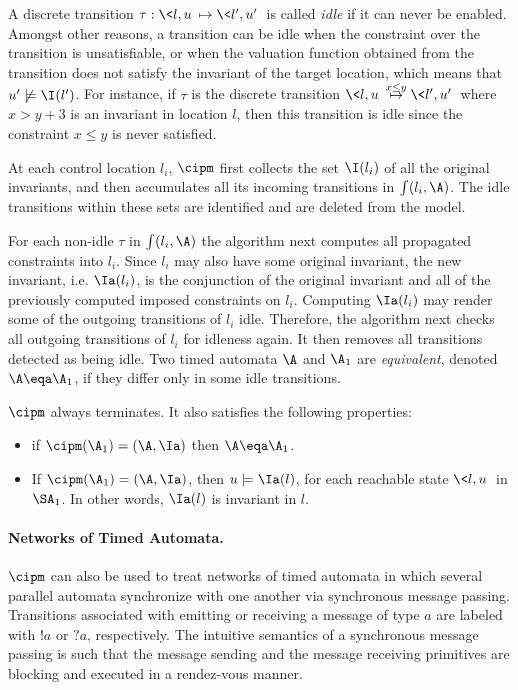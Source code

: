 \documentclass{eptcs}
\begin{document}
A discrete transition $\tau: \< l,u\>\mapsto\< l',u'\> $ is called {\em idle}
if it can never be enabled.  Amongst other reasons, a transition can be idle
when the constraint over the transition is unsatisfiable, or when the
valuation function obtained from the transition does not satisfy the invariant
of the target location, which means that $u'\not \models \I(l')$.  For
instance, if $\tau$ is the discrete transition $\<l,u\>\stackrel{x\leq
  y}{\mapsto}\<l',u'\>$ where $x> y+3$ is an invariant in location $l$, then
this transition is idle since the constraint $x\leq y$ is never satisfied.

At each control location $l_i$, $\cipm$ first collects the set $\I(l_i)$ of
all the original invariants, and then accumulates all its incoming transitions
in $\int(l_i,\A)$.  The idle transitions within these sets are identified and
are deleted from the model.


For each non-idle $\tau$ in $\int(l_i,\A)$ the algorithm next computes all
propagated constraints into $l_i$.  Since $l_i$ may also have some original
invariant, the new invariant, i.e. $\Ia(l_i)$, is the conjunction of the
original invariant and all of the previously computed imposed constraints on
$l_i$.  Computing $\Ia(l_i)$ may render some of the outgoing transitions of
$l_i$ idle.  Therefore, the algorithm next checks all outgoing transitions of
$l_i$ for idleness again.  It then removes all transitions detected as being
idle.
Two timed automata $\A$ and $\A_1$ are {\em equivalent}, denoted $\A\eqa\A_1$,
if they differ only in some idle transitions.
\begin{theorem}
\label{theo.inv}
$\cipm$ always terminates. It also satisfies the following properties:
\begin{itemize} 
\item if $\cipm(\A_1)=(\A,\Ia)$ then $\A\eqa\A_1$.
\item If $\cipm(\A_1)=(\A,\Ia)$, then $u\models\Ia(l)$, for each reachable
  state $\<l,u\>$ in $\SA_1$.  In other words, $\Ia(l)$ is invariant in $l$.
\end{itemize}
\end{theorem}



\paragraph{Networks of Timed Automata.}

$\cipm$ can also be used to treat networks of timed automata in which several
parallel automata synchronize with one another via synchronous message passing.
Transitions associated with emitting or receiving a message of type $a$ are labeled
with $!a$ or $?a$, respectively. 
The intuitive semantics of a synchronous message passing is such that the message sending and the 
message receiving primitives are blocking and executed in a rendez-vous manner.
\end{document}
